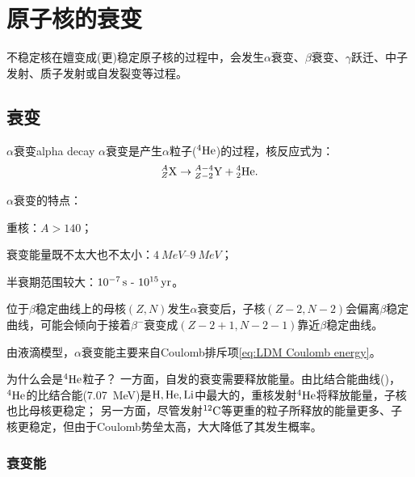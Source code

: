 \chapter{原子核的衰变}
不稳定核在嬗变成(更)稳定原子核的过程中，会发生$\alpha$衰变、$\beta$衰变、$\gamma$跃迁、中子发射、质子发射或自发裂变等过程。

\section{\textalpha 衰变}

\begin{definition}
	{$\alpha$衰变}{alpha decay}
	$\alpha$衰变是产生$\alpha$粒子(${^{4}\mathrm{He}}$)的过程，核反应式为：
	\begin{equation}
		{^{A}_{Z}\mathrm{X}} \to {^{A-4}_{Z-2}\mathrm{Y}} + {^{4}_{2}\mathrm{He}}.
	\end{equation}
\end{definition}

\begin{remark}
	$\alpha$衰变的特点：
	\begin{compactenum}
		\item 重核：$A>140$；
		\item 衰变能量既不太大也不太小：$\SIrange{4}{9}{MeV}$；
		\item 半衰期范围较大：$\SI{e-7}{s}~\text{-}~\SI{e15}{yr}$。
		\item 位于$\beta$稳定曲线上的母核$(Z,N)$发生$\alpha$衰变后，子核$(Z-2,N-2)$会偏离$\beta$稳定曲线，可能会倾向于接着$\beta^-$衰变成$(Z-2+1,N-2-1)$靠近$\beta$稳定曲线。
	\end{compactenum}
\end{remark}

\begin{corollary}
	由液滴模型，$\alpha$衰变能主要来自Coulomb排斥项\eqref{eq:LDM Coulomb energy}。
\end{corollary}

\begin{remark}
	为什么会是${^{4}\mathrm{He}}$粒子？
	一方面，自发的衰变需要释放能量。由比结合能曲线()，${^{4}\mathrm{He}}$的比结合能(\SI{7.07}{MeV})是$\mathrm{H},\mathrm{He},\mathrm{Li}$中最大的，重核发射${^{4}\mathrm{He}}$将释放能量，子核也比母核更稳定；
	另一方面，尽管发射${^{12}\mathrm{C}}$等更重的粒子所释放的能量更多、子核更稳定，但由于Coulomb势垒太高，大大降低了其发生概率。
\end{remark}

\subsection{\textalpha 衰变能}

